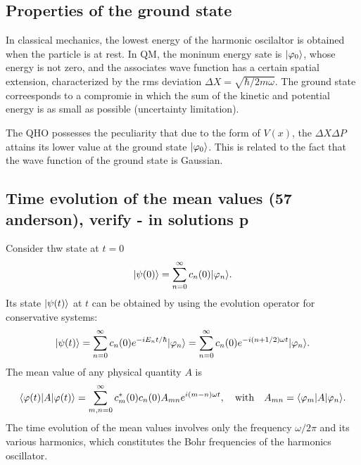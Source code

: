 \subsection{Properties of the ground state}
In classical mechanics, the lowest energy of the harmonic oscilaltor is obtained when the particle is at rest. In QM, the moninum energy sate is $|\varphi_0\rangle$, whose energy 
is not zero, and the associates wave function has a certain spatial extension, characterized by the rms deviation $\Delta X=\sqrt{\hbar/2m\omega}$.
The ground state correesponds to a compromie in which the sum of the kinetic and potential energy is as small as possible (uncertainty limitation).

\begin{emphasizer}
    The QHO possesses the peculiarity that due to the form of $V(x)$, the $\Delta X\Delta P$ attains its lower value at the ground state $|\varphi_0\rangle$. This is related to 
    the fact that the wave function of the ground state is Gaussian.
\end{emphasizer}

\subsection{Time evolution of the mean values (57 anderson), verify - in solutions p}
Consider thw state at $t=0$ 
\begin{align*}
    |\psi(0)\rangle=\sum_{n=0}^\infty c_n(0)|\varphi_n\rangle.
\end{align*}
Its state $|\psi(t)\rangle$ at $t$ can be obtained by using the evolution operator for conservative systems:
\begin{align}
    |\psi(t)\rangle=\sum_{n=0}^\infty c_n(0)e^{-iE_nt/\hbar}|\varphi_n\rangle=\sum_{n=0}^\infty c_n(0)e^{-i(n+1/2)\omega t}|\varphi_n\rangle.
\end{align}
The mean value of any physical quantity $A$ is 
\begin{align*}
    \langle\varphi(t)|A|\varphi(t)\rangle=\sum_{m,n=0}^\infty c_m^*(0)c_n(0)A_{mn}e^{i(m-n)\omega t},\quad\text{with}\quad A_{mn}=\langle\varphi_m|A|\varphi_n\rangle.
\end{align*}
The time evolution of the mean values involves only the frequency $\omega/2\pi$ and its various harmonics, which constitutes the Bohr frequencies of the harmonics oscillator.

